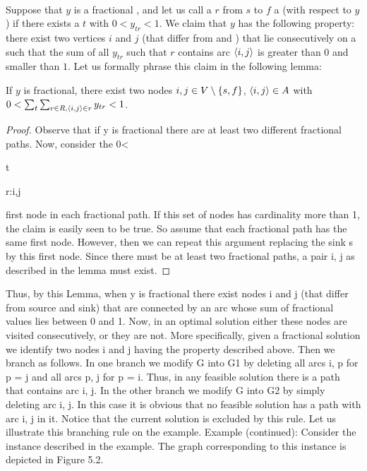 \paragraph{}
Suppose that $y$ is a fractional , and let us call a  $r$ from $s$ to $f$ a  (with respect to $y$) if there exists a $t$ with $0<y_{tr}<1$. We claim that $y$ has the following property: there exist two vertices $i$ and $j$ (that differ from  and ) that lie consecutively on a  such that the sum of all $y_{tr}$ such that $r$ contains arc $\left\langle i,j \right\rangle$ is greater than $0$ and smaller than $1$. Let us formally phrase this claim in the following lemma:

\begin{lemma}
If $y$ is fractional, there exist two nodes $i,j\in V\setminus\left\{ s,f \right\}$, $\left\langle i,j \right\rangle\in A$ with $0<\sum_t{\sum_{r\in R,\left\langle i,j \right\rangle\in r}y_{tr}}<1$.

\begin{proof}
Observe that if y is fractional there are at least two different fractional paths. Now, consider the
0<

t

r:{i,j}

first node in each fractional path. If this set of nodes has cardinality more than 1, the claim is easily seen
to be true. So assume that each fractional path has the same first node. However, then we can repeat
this argument replacing the sink s by this first node. Since there must be at least two fractional paths,
a pair i, j as described in the lemma must exist.
\end{proof}
\end{lemma}

Thus, by this Lemma, when y is fractional there exist nodes i and j (that differ from source and sink)
that are connected by an arc whose sum of fractional values lies between 0 and 1. Now, in an optimal
solution either these nodes are visited consecutively, or they are not. More specifically, given a fractional solution we identify two nodes i and j having the property described above. Then we branch as follows.
In one branch we modify G into G1 by deleting all arcs {i, p} for p = j and all arcs {p, j} for p = i. Thus,
in any feasible solution there is a path that contains arc {i, j}. In the other branch we modify G into G2
by simply deleting arc {i, j}. In this case it is obvious that no feasible solution has a path with arc {i, j}
in it. Notice that the current solution is excluded by this rule. Let us illustrate this branching rule on
the example.
Example (continued): Consider the instance described in the example. The graph corresponding to
this instance is depicted in Figure 5.2.

